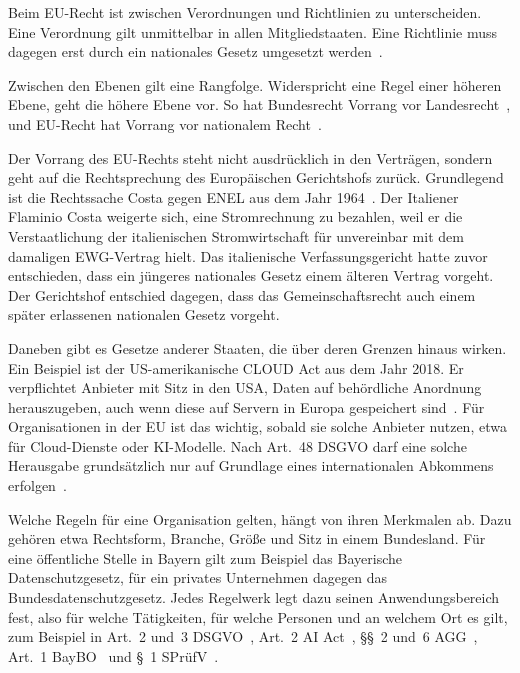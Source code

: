 Beim EU-Recht ist zwischen Verordnungen und Richtlinien zu unterscheiden.
Eine Verordnung gilt unmittelbar in allen Mitgliedstaaten.
Eine Richtlinie muss dagegen erst durch ein nationales Gesetz umgesetzt werden~\cite{aeuv}.

Zwischen den Ebenen gilt eine Rangfolge.
Widerspricht eine Regel einer höheren Ebene, geht die höhere Ebene vor.
So hat Bundesrecht Vorrang vor Landesrecht~\cite{gg}, und EU-Recht hat Vorrang vor nationalem Recht~\cite{costa1964}.

Der Vorrang des EU-Rechts steht nicht ausdrücklich in den Verträgen, sondern geht auf die Rechtsprechung des Europäischen Gerichtshofs zurück.
Grundlegend ist die Rechtssache Costa gegen ENEL aus dem Jahr 1964~\cite{costa1964}.
Der Italiener Flaminio Costa weigerte sich, eine Stromrechnung zu bezahlen, weil er die Verstaatlichung der italienischen Stromwirtschaft für unvereinbar mit dem damaligen EWG-Vertrag hielt.
Das italienische Verfassungsgericht hatte zuvor entschieden, dass ein jüngeres nationales Gesetz einem älteren Vertrag vorgeht.
Der Gerichtshof entschied dagegen, dass das Gemeinschaftsrecht auch einem später erlassenen nationalen Gesetz vorgeht.

Daneben gibt es Gesetze anderer Staaten, die über deren Grenzen hinaus wirken.
Ein Beispiel ist der US-amerikanische CLOUD Act aus dem Jahr 2018.
Er verpflichtet Anbieter mit Sitz in den USA, Daten auf behördliche Anordnung herauszugeben, auch wenn diese auf Servern in Europa gespeichert sind~\cite{cloudact}.
Für Organisationen in der EU ist das wichtig, sobald sie solche Anbieter nutzen, etwa für Cloud-Dienste oder KI-Modelle.
Nach Art.~48 DSGVO darf eine solche Herausgabe grundsätzlich nur auf Grundlage eines internationalen Abkommens erfolgen~\cite{dsgvo}.

Welche Regeln für eine Organisation gelten, hängt von ihren Merkmalen ab.
Dazu gehören etwa Rechtsform, Branche, Größe und Sitz in einem Bundesland.
Für eine öffentliche Stelle in Bayern gilt zum Beispiel das Bayerische Datenschutzgesetz, für ein privates Unternehmen dagegen das Bundesdatenschutzgesetz.
Jedes Regelwerk legt dazu seinen Anwendungsbereich fest, also für welche Tätigkeiten, für welche Personen und an welchem Ort es gilt, zum Beispiel in Art.~2 und~3 DSGVO~\cite{dsgvo}, Art.~2 AI Act~\cite{aiact2024}, §§~2 und~6 AGG~\cite{agg}, Art.~1 BayBO~\cite{baybo} und §~1 SPrüfV~\cite{sprufv}.

